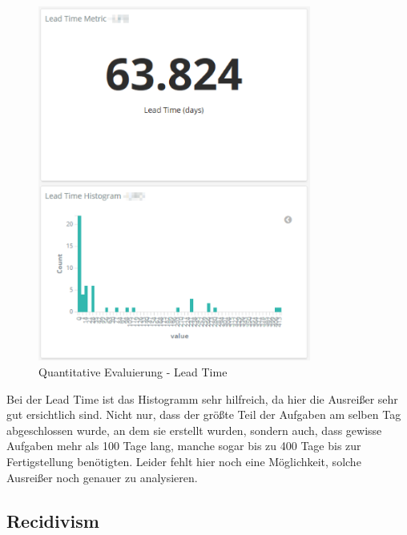 \begin{savenotes}
    \begin{figure}[H]
      \centering
      \includegraphics[width=0.8\textwidth]{img/eval-lead.png}
      \caption{Quantitative Evaluierung {-} Lead Time}\label{fig:eval_lead_time}
    \end{figure}
\end{savenotes}

Bei der Lead Time ist das Histogramm sehr hilfreich, da hier die Ausreißer sehr gut ersichtlich sind.
Nicht nur, dass der größte Teil der Aufgaben am selben Tag abgeschlossen wurde, an dem sie erstellt wurden, sondern auch, dass gewisse Aufgaben mehr als 100 Tage lang, manche sogar bis zu 400 Tage bis zur Fertigstellung benötigten.
Leider fehlt hier noch eine Möglichkeit, solche Ausreißer noch genauer zu analysieren.

\clearpage
\subsection*{Recidivism}


